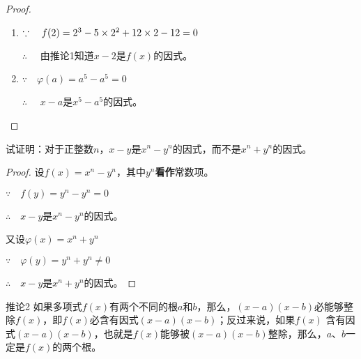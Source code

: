 \begin{proof}
\begin{enumerate}
    \item $\because\quad f(2)=2^3-5\times 2^2+12\times2-12=0$
    
    $\therefore\quad $ 由推论1知道$x-2$是$f(x)$的因式。
    \item $\because\quad \varphi(a)=a^5-a^5=0$
    
    $\therefore\quad $ $x-a$是$x^5-a^5$的因式。
\end{enumerate}

\end{proof}

\begin{example}
试证明：对于正整数$n$，$x-y$是$x^n-y^n$的因式，而不是$x^n+y^n$的因式。
\end{example}

\begin{proof}
设$f(x)=x^n-y^n$，其中$y^n$\textbf{看作}常数项。

$\because\quad f (y) =y^n -y^n=0$

$\therefore\quad x-y$是$x^n-y^n$的因式。

又设$\varphi(x)=x^n+y^n$

$\because\quad \varphi(y) =y^n +y^n\ne 0$

$\therefore\quad x-y$是$x^n+y^n$的因式。
\end{proof}

\begin{blk}{推论2}
如果多项式$f(x)$有两个不同的根$a$和$b$，那么，$(x-a)(x-b)$必能够整除$f(x)$，即$f(x)$必含有因式$(x-a)(x-b)$；反过来说，如果$f(x)$ 含有因式$(x-a)(x-b)$，也就是$f(x)$能够被$(x-a)(x-b)$整除，那么，$a$、$b$一定是$f(x)$的两个根。
\end{blk}

